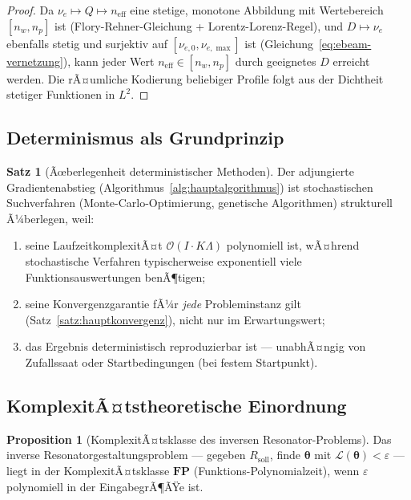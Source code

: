 ﻿\documentclass[a4paper,12pt]{article}
\theoremstyle{definition}
\newtheorem{satz}{Satz}[section]
\newtheorem{proposition}{Proposition}[section]
\newcommand{\ordre}[1]{\mathcal{O}\!\left(#1\right)}
\newcommand{\vect}[1]{\bm{#1}}
\begin{document}
	\begin{proof}
		Da $\nu_e \mapsto Q \mapsto n_\mathrm{eff}$ eine stetige, monotone Abbildung
		mit Wertebereich $[n_w, n_p]$ ist (Flory-Rehner-Gleichung + Lorentz-Lorenz-Regel),
		und $D \mapsto \nu_e$ ebenfalls stetig und surjektiv auf
		$[\nu_{e,0}, \nu_{e,\max}]$ ist (Gleichung~\eqref{eq:ebeam-vernetzung}),
		kann jeder Wert $n_\mathrm{eff} \in [n_w, n_p]$ durch geeignetes $D$ erreicht werden.
		Die rÃ¤umliche Kodierung beliebiger Profile folgt aus der Dichtheit
		stetiger Funktionen in $L^2$.
	\end{proof}
	
	\subsection{Determinismus als Grundprinzip}
	
	\begin{satz}[Ãœberlegenheit deterministischer Methoden]
		\label{satz:determinismus}
		Der adjungierte Gradientenabstieg (Algorithmus~\ref{alg:hauptalgorithmus})
		ist stochastischen Suchverfahren (Monte-Carlo-Optimierung, genetische
		Algorithmen) strukturell Ã¼berlegen, weil:
		\begin{enumerate}[label=(\roman*)]
			\item seine LaufzeitkomplexitÃ¤t $\ordre{I \cdot K\Lambda}$ polynomiell ist,
			wÃ¤hrend stochastische Verfahren typischerweise exponentiell viele
			Funktionsauswertungen benÃ¶tigen;
			\item seine Konvergenzgarantie fÃ¼r \emph{jede} Probleminstanz gilt
			(Satz~\ref{satz:hauptkonvergenz}), nicht nur im Erwartungswert;
			\item das Ergebnis deterministisch reproduzierbar ist --- unabhÃ¤ngig von
			Zufallssaat oder Startbedingungen (bei festem Startpunkt).
		\end{enumerate}
	\end{satz}
	
	\subsection{KomplexitÃ¤tstheoretische Einordnung}
	
	\begin{proposition}[KomplexitÃ¤tsklasse des inversen Resonator-Problems]
		\label{prop:komplexitaet}
		Das inverse Resonatorgestaltungsproblem --- gegeben $R_\mathrm{soll}$,
		finde $\vect{\theta}$ mit $\mathcal{L}(\vect{\theta}) < \varepsilon$ ---
		liegt in der KomplexitÃ¤tsklasse $\mathbf{FP}$ (Funktions-Polynomialzeit),
		wenn $\varepsilon$ polynomiell in der EingabegrÃ¶ÃŸe ist.
	\end{proposition}
	
\end{document}
